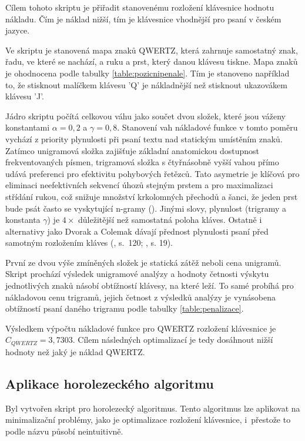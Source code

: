 \documentclass[a4paper, twoside, 12pt, czech]{article}
\begin{document}
Cílem tohoto skriptu je přiřadit stanovenému rozložení klávesnice hodnotu nákladu. 
Čím je náklad nižší, tím je klávesnice vhodnější pro psaní v českém jazyce.

Ve skriptu je stanovená mapa znaků QWERTZ, která zahrnuje samostatný znak, řadu, 
ve které se nachází, a ruku a prst, který danou klávesu tiskne. Mapa znaků je ohodnocena
podle tabulky \ref{table:pozicnipenale}. Tím je stanoveno například to, že stisknout malíčkem klávesu 'Q' je 
nákladnější než stisknout ukazovákem klávesu 'J'.

Jádro skriptu počítá celkovou váhu jako součet dvou složek, které jsou váženy 
konstantami $\alpha = 0,2$ a $\gamma = 0,8$. 
Stanovení vah nákladové funkce v tomto poměru vychází z priority plynulosti při psaní 
textu nad statickým umístěním znaků. Zatímco unigramová složka zajišťuje základní 
anatomickou dostupnost frekventovaných písmen, trigramová složka s čtyřnásobně 
vyšší vahou přímo udá\-vá preferenci pro efektivitu pohybových řetězců. Tato 
asymetrie je klíčová pro eliminaci neefektivních sekvencí úhozů stejným prstem 
a pro maximalizaci střídání rukou, což snižuje množství krkolomných přechodů a šanci,
že jeden prst bude psát často se vyskytující n-gramy (\cite{engramapproach}). Jinými slovy, plynulost (trigramy a konstanta $\gamma$) je $4\times$ 
důležitější než samostatná poloha kláves. Ostatně i alternativy jako Dvorak a Colemak
dávají přednost plynulosti psaní před samotným rozložením kláves (\cite{qwerty-immortal}, s.~120; \cite{hidden-in-plain-sight}, s. 19).

První ze dvou výše zmíněných složek je statická zátěž neboli cena unigramů. Skript 
prochází výsledek unigramové analýzy a hodnoty četnosti výskytu jednotlivých 
znaků násobí obtížností klávesy, na které leží. To samé probíhá pro nákladovou 
cenu trigramů, jejich četnost z výsledků analýzy je vynásobena obtíž\-ností psaní 
daného trigramu podle tabulky \ref{table:penalizace}. 

Výsledkem výpočtu nákladové funkce pro QWERTZ rozložení klávesnice je $C_{QWERTZ}=3,7303$. 
Cílem následných optimalizací je tedy dosáhnout nižší hodnoty než jaký je náklad 
QWERTZ.

\subsection{Aplikace horolezeckého algoritmu}
Byl vytvořen skript pro horolezecký algoritmus. Tento algoritmus lze aplikovat na 
minimalizační problémy, jako je optimalizace rozložení klávesnice, i~přesto\-že to 
podle názvu působí neintuitivně.
\end{document}
